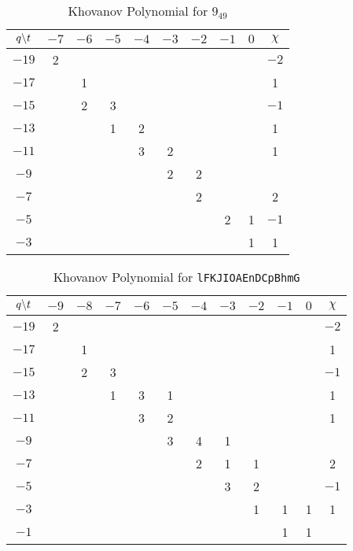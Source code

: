     \begin{table}
        \centering
        \begin{tabular}{| c | c | c | c | c | c | c | c | c | c |}
            \hline
            $q\symbol{92}t$&$-7$&$-6$&$-5$&$-4$&$-3$&$-2$&$-1$&$0$&$\chi$\\
            \hline
            $-19$&2&&&&&&&&$-2$\\
            \hline
            $-17$&&1&&&&&&&1\\
            \hline
            $-15$&&2&3&&&&&&$-1$\\
            \hline
            $-13$&&&1&2&&&&&1\\
            \hline
            $-11$&&&&3&2&&&&1\\
            \hline
            $-9$&&&&&2&2&&&\\
            \hline
            $-7$&&&&&&2&&&2\\
            \hline
            $-5$&&&&&&&2&1&$-1$\\
            \hline
            $-3$&&&&&&&&1&1\\
            \hline
        \end{tabular}
        \caption{Khovanov Polynomial for $9_{49}$}
    \end{table}
    \begin{table}
        \centering
        \begin{tabular}{| c | c |c | c | c | c | c | c | c | c | c | c |}
            \hline
            $q\symbol{92}t$&$-9$&$-8$&$-7$&$-6$&$-5$&$-4$&$-3$&$-2$&$-1$&$0$&$\chi$\\
            \hline
            $-19$&2&&&&&&&&&&$-2$\\
            \hline
            $-17$&&1&&&&&&&&&1\\
            \hline
            $-15$&&2&3&&&&&&&&$-1$\\
            \hline
            $-13$&&&1&3&1&&&&&&1\\
            \hline
            $-11$&&&&3&2&&&&&&1\\
            \hline
            $-9$&&&&&3&4&1&&&&\\
            \hline
            $-7$&&&&&&2&1&1&&&2\\
            \hline
            $-5$&&&&&&&3&2&&&$-1$\\
            \hline
            $-3$&&&&&&&&1&1&1&1\\
            \hline
            $-1$&&&&&&&&&1&1&\\
            \hline
        \end{tabular}
        \caption{Khovanov Polynomial for \texttt{lFKJIOAEnDCpBhmG}}
    \end{table}

